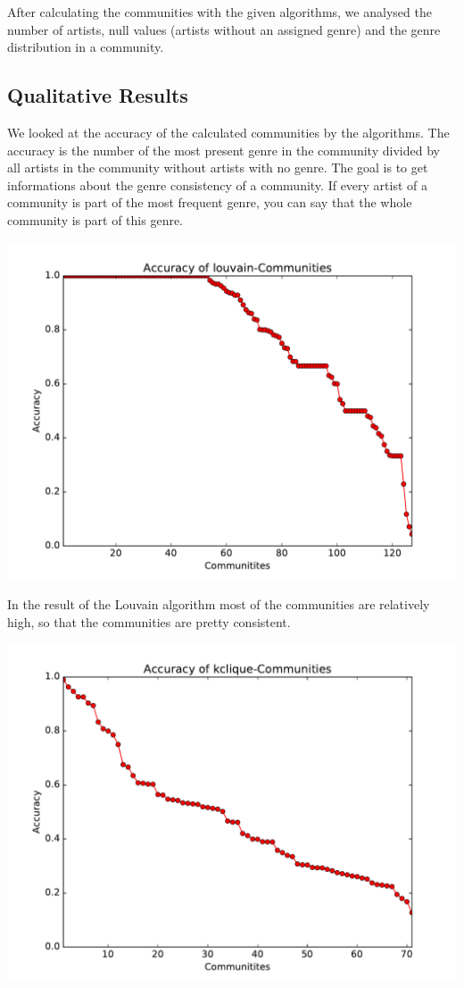 \documentclass[11pt,a4paper,onecolumn,notitlepage]{article}
\begin{document}
After calculating the communities with the given algorithms, we analysed the number of artists, null values (artists without an assigned genre) and the genre distribution in a community.

\subsection{Qualitative Results}

We looked at the accuracy of the calculated communities by the algorithms. The accuracy is the number of the most present genre in the community divided by all artists in the community without artists with no genre. The goal is to get informations about the genre consistency of a community. If every artist of a community is part of the most frequent genre, you can say that the whole community is part of this genre.

\includegraphics[scale=0.4]{spotify_acc_louvain.pdf}

In the result of the Louvain algorithm most of the communities are relatively high, so that the communities are pretty consistent.

\includegraphics[scale=0.4]{spotify_acc_kclique.pdf}
\end{document}
